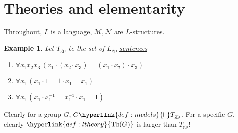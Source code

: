 \documentclass{article}
\let\models\vDash
\DeclareMathOperator{\Mod}{Mod}
\DeclareMathOperator{\Th}{Th}
\newtheorem{nexample}[nthm]{Example}
\newcommand{\named}[1]{\textbf{#1}\index{#1}}
\begin{document}
\clearpage
\section{Theories and elementarity}
Throughout, $L$ is a \hyperlink{def:lang}{language}, $\mathcal{M}, \mathcal{N}$ are \hyperlink{def:lstr}{$L$-structures}.
\begin{nexample}\label{eg:3.2}
  Let $T_{\text{gp}}$ be the set of \hyperlink{def:lgp}{$L_{\text{gp}}$}-\hyperlink{def:sentence}{sentences}
  \begin{enumerate}[label=(\roman*)]
    \item $\forall x_1 x_2 x_3\, (x_1 \cdot (x_2 \cdot x_3) = (x_1 \cdot x_2) \cdot x_3)$
    \item $\forall x_1\, (x_1 \cdot 1 = 1 \cdot x_1 = x_1)$
    \item $\forall x_1\,(x_1 \cdot x_1^{-1} = x_1^{-1} \cdot x_1 = 1)$
  \end{enumerate}
\end{nexample}
Clearly for a group $G$, $G \hyperlink{def:models}{\models} T_{\text{gp}}$. For a specific $G$, clearly $\hyperlink{def:ltheory}{\Th(G)}$ is larger than $T_{\text{gp}}$!
\end{document}

